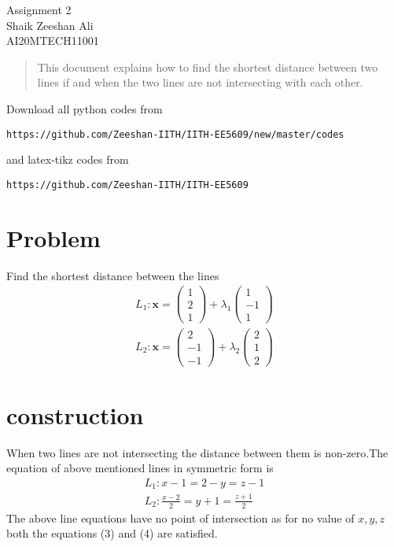 \documentclass[journal,12pt,twocolumn]{IEEEtran}
\begin{document}
\begin{center}
\huge Assignment 2\\

\large Shaik Zeeshan Ali\\
\large AI20MTECH11001\\
\end{center}
\vspace{0.5cm}
\begin{abstract}
This document explains how to find the shortest distance between two lines if and when the two lines are not intersecting with each other.
\end{abstract}
\vspace{0.5cm}
Download all python codes from 
\begin{lstlisting}
https://github.com/Zeeshan-IITH/IITH-EE5609/new/master/codes
\end{lstlisting}
%
and latex-tikz codes from 
\begin{lstlisting}
https://github.com/Zeeshan-IITH/IITH-EE5609
\end{lstlisting}
%
\vspace{0.5cm}
\section{Problem}
Find the shortest distance between the lines \\
\begin{align}
    L_1\colon \bm{x}= \begin{pmatrix}1\\2\\1\end{pmatrix}+\lambda_1\begin{pmatrix}1\\-1\\1\end{pmatrix}\\
    L_2\colon \bm{x}= \begin{pmatrix}2\\-1\\-1\end{pmatrix}+\lambda_2\begin{pmatrix}2\\1\\2\end{pmatrix}
\end{align}
\section{construction}
When two lines are not intersecting the distance between them is non-zero.The equation of above mentioned lines in symmetric form is
\begin{align}
    L_1\colon x-1=2-y=z-1\\
    L_2\colon \frac{x-2}{2}=y+1=\frac{z+1}{2}
\end{align}
The above line equations have no point of intersection as for no value of $x,y,z$ both the equations (3) and (4) are satisfied.
\end{document}
